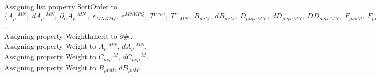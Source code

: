\documentclass[11pt]{article}
\begin{document}
Assigning list property SortOrder to $\{{A}_{\mu}\,^{M N},\; {dA}_{\mu}\,^{M N},\; {\partial}_{\alpha}{{A}_{\mu}\,^{M N}}\, ,\; {\epsilon}_{M N K P Q},\; {\epsilon}^{M N K P Q},\; {T}^{\mu \nu \rho \sigma},\; {T}^{\alpha}\,_{M N},\; {B}_{\mu \nu M},\; {dB}_{\mu \nu M},\; {D}_{\mu \nu \rho \sigma M N}\, ,\; {dD}_{\mu \nu \rho \sigma M N},\; {DD}_{\mu \nu \rho \sigma M N},\; {F}_{\mu \nu \rho M},\; {F}_{\mu \nu \rho \sigma}\,^{M},\; {\partial}_{\mu}{{A}_{\mu}\,^{M N}}\, ,\; {\partial}_{\alpha}{{dA}_{\mu}\,^{M N}}\, ,\; {\partial}_{\alpha}{{F}_{\mu \nu}\,^{M N}}\, ,\; {\partial}_{\alpha}{{B}_{\mu \nu M}}\, ,\; {\partial}_{\alpha}{{dB}_{\mu \nu M}}\, ,\; {\partial}_{\alpha}{{F}_{\mu \nu \rho M}}\, ,\; {\partial}_{\alpha}{{C}_{\mu \nu \rho}\,^{M}}\, ,\; {\partial}_{\alpha}{{dC}_{\mu \nu \rho}\,^{M}}\, ,\; {\partial}_{\alpha}{{F}_{\mu \nu \rho \sigma}\,^{M}}\, ,\; {\partial}_{\alpha}{{G}_{\mu \nu \rho \sigma M N}}\, ,\; {\partial}_{\alpha}{{dG}_{\mu \nu \rho \sigma M N}}\, ,\; {\delta}^{M1}\,_{M},\; {\delta}_{M1}\,^{M},\; a1,\; a2,\; a3,\; a4,\; a5,\; a6,\; a7,\; a8,\; a9,\; a10,\; a11,\; a12,\; b1,\; b2,\; b3,\; b4,\; b5,\; b6,\; b7,\; b8,\; b9,\; b10,\; b11,\; b12,\; c1,\; c2,\; c3,\; c4,\; c5,\; c6,\; c7,\; d1,\; d2,\; d3,\; d4,\; d5,\; d6,\; d7\}$.
\\
Assigning property WeightInherit to $\partial{\#}\, $.
\\
Assigning property Weight to ${A}_{\mu}\,^{M N}$, ${dA}_{\mu}\,^{M N}$.
\\
Assigning property Weight to ${C}_{\mu \nu \rho}\,^{M}$, ${dC}_{\mu \nu \rho}\,^{M}$.
\\
Assigning property Weight to ${B}_{\mu \nu M}$, ${dB}_{\mu \nu M}$.
\\
\end{document}
